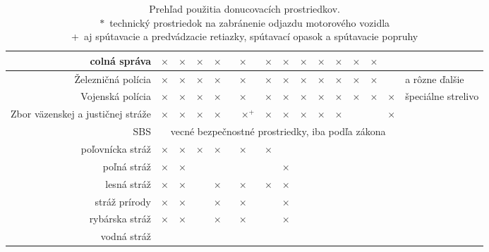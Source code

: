 \documentclass[openany]{book}
\begin{document}
\begin{sidewaystable}
\begin{tabular}{|r|c|c|c|c|c|c|c|c|c|c|c|c|c|l|}
\hline
colná správa & $\times$ & $\times$ & $\times$ & $\times$ & $\times$ & $\times$ & $\times$ & $\times$ & $\times$ & $\times$ & $\times$ & $\times$ &  & \\
\hline
Železničná polícia & $\times$ & $\times$ & $\times$ & $\times$ & $\times$ & $\times$ & $\times$ & $\times$ & $\times$ & $\times$ & $\times$ & $\times$ &  & a rôzne ďalšie\\
\hline
Vojenská polícia & $\times$ & $\times$ & $\times$ & $\times$ & $\times$ & $\times$ & $\times$ & $\times$ & $\times$ & $\times$ & $\times$ & $\times$ & $\times$ & špeciálne strelivo \\
\hline
Zbor väzenskej a justičnej stráže & $\times$ & $\times$ & $\times$ & $\times$ &~~$\times$$^{+}$& $\times$ & $\times$ & $\times$ & $\times$ & $\times$ &  &  & $\times$ & \\
\hline
SBS & \multicolumn{13}{|c|}{vecné bezpečnostné prostriedky, iba podľa zákona} & \\
\hline
poľovnícka stráž & $\times$ & $\times$ & $\times$ & $\times$ & $\times$ & $\times$ &  &  &  &  &  &  &  & \\
\hline
poľná stráž & $\times$ & $\times$ &  &  &  &  & $\times$ &  &  &  &  &  &  & \\
\hline
lesná stráž & $\times$ & $\times$ &  & $\times$ & $\times$ & $\times$ & $\times$ &  &  &  &  &  &  & \\
\hline
stráž prírody & $\times$ & $\times$ &  & $\times$ & $\times$ &  & $\times$ &  &  &  &  &  &  & \\
\hline
rybárska stráž & $\times$ & $\times$ &  & $\times$ & $\times$ &  & $\times$ &  &  &  &  &  &  & \\
\hline
vodná stráž &  &  &  &  &  &  &  &  &  &  &  &  &  & \\
\hline
\end{tabular}

\caption[Prehľad použitia donucovacích prostriedkov]{Prehľad použitia donucovacích prostriedkov.\\
$*$~technický prostriedok na zabránenie odjazdu motorového vozidla\\
+~aj spútavacie a predvádzacie retiazky, spútavací opasok a spútavacie popruhy
}\label{rotfloat2} \end{sidewaystable} 


\vskip 0.5cm


\end{document}
